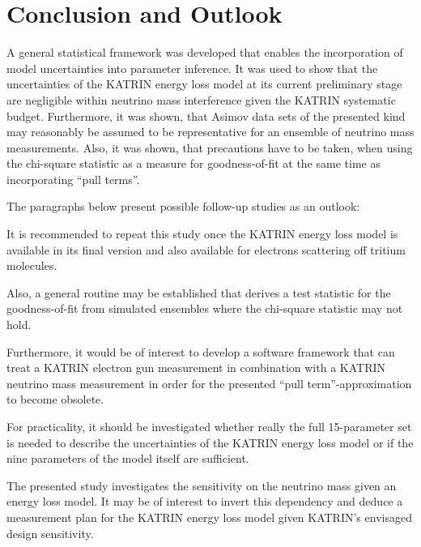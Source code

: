 \section{Conclusion and Outlook}
\label{sec:katrinElossModelOutlook}
A general statistical framework was developed that enables the incorporation of model uncertainties into parameter inference. It was used to show that the uncertainties of the KATRIN energy loss model at its current preliminary stage are negligible within neutrino mass interference given the KATRIN systematic budget. Furthermore, it was shown, that Asimov data sets of the presented kind may reasonably be assumed to be representative for an ensemble of neutrino mass measurements. Also, it was shown, that precautions have to be taken, when using the chi-square statistic as a measure for goodness-of-fit at the same time as incorporating ``pull terms''. 

The paragraphs below present possible follow-up studies as an outlook:

It is recommended to repeat this study once the KATRIN energy loss model is available in its final version and also available for electrons scattering off tritium molecules.

Also, a general routine may be established that derives a test statistic for the goodness-of-fit from simulated ensembles where the chi-square statistic may not hold. 

Furthermore, it would be of interest to develop a software framework that can treat a KATRIN electron gun measurement in combination with a KATRIN neutrino mass measurement in order for the presented ``pull term''-approximation to become obsolete.

For practicality, it should be investigated whether really the full 15-parameter set is needed to describe the uncertainties of the KATRIN energy loss model or if the nine parameters of the model itself are sufficient.

The presented study investigates the sensitivity on the neutrino mass given an energy loss model. It may be of interest to invert this dependency and deduce a measurement plan for the KATRIN energy loss model given KATRIN's envisaged design sensitivity.